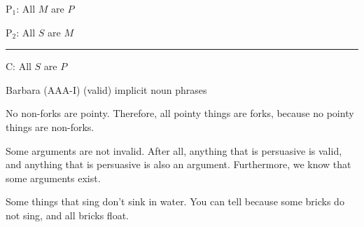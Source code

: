 {\begin{exercises}
{\begin{earg} 
\item[P$_1$:] All $M$ are $P$
\item[P$_2$:] All $S$ are $M$
\vspace{-.5em} 
 \item [] \rule{0.6\linewidth}{.5pt} 
\item[C:] All $S$ are $P$
 \end{earg} 
Barbara (AAA-I) (valid) 
 implicit noun phrases 
}

\item No non-forks are pointy. Therefore, all pointy things are forks, because no pointy things are non-forks. 


\item Some arguments are not invalid. After all, anything that is persuasive is valid, and anything that is persuasive is also an argument. Furthermore, we know that some arguments exist.



\item Some things that sing don't sink in water. You can tell because some bricks do not sing, and all bricks float.
 
\end{exercises}}
